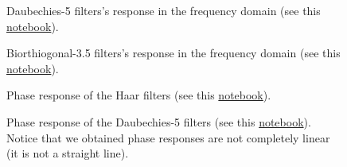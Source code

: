 \begin{figure}
  \centering
  \caption{Daubechies-5 filters's response in the frequency domain
    (see this
    \href{https://github.com/Sistemas-Multimedia/Sistemas-Multimedia.github.io/blob/master/milestones/08-DWT/DWT_filters_analysis.ipynb}{notebook}).}
  \label{fig:db5_modulus}
\end{figure}

\begin{figure}
  \centering
  \caption{Biorthiogonal-3.5 filters's response in the frequency
    domain (see this
    \href{https://github.com/Sistemas-Multimedia/Sistemas-Multimedia.github.io/blob/master/milestones/08-DWT/DWT_filters_analysis.ipynb}{notebook}).}
  \label{fig:bior3.5_modulus}
\end{figure}

\begin{figure}
  \centering
  \caption{Phase response of the Haar filters (see this
    \href{https://github.com/Sistemas-Multimedia/Sistemas-Multimedia.github.io/blob/master/milestones/08-DWT/DWTfilters_analysis.ipynb}{notebook}).}
  \label{fig:haar_phase}
\end{figure}

\begin{figure}
  \centering {}
  \caption{Phase response of the Daubechies-5 filters (see this
    \href{https://github.com/Sistemas-Multimedia/Sistemas-Multimedia.github.io/blob/master/milestones/08-DWT/DWT_filters_analysis.ipynb}{notebook}). Notice
    that we obtained phase responses are not completely linear (it is
    not a straight line).}
  \label{fig:db5_phase}
\end{figure}


